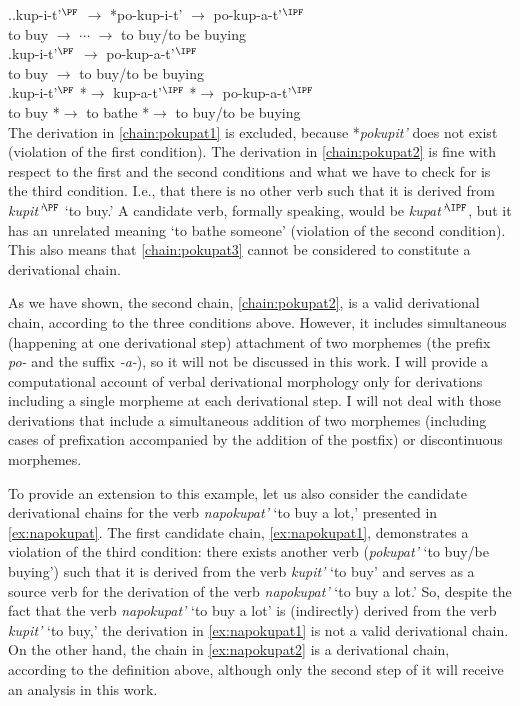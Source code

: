 \ex.\label{chain:pokupat}\ag.\label{chain:pokupat1}kup-i-t'$^\PF$ $\rightarrow$ *po-kup-i-t' $\rightarrow$ po-kup-a-t'$^\IPF$\\	
{to buy} $\rightarrow$ $\cdots$ $\rightarrow$ {to buy/to be buying}\\
\bg.\label{chain:pokupat2}kup-i-t'$^\PF$ $\rightarrow$ po-kup-a-t'$^\IPF$\\
{to buy} $\rightarrow$ {to buy/to be buying}\\
\bg.\label{chain:pokupat3}kup-i-t'$^\PF$ *$\rightarrow$ kup-a-t'$^\IPF$ *$\rightarrow$ po-kup-a-t'$^\IPF$\\
{to buy} *$\rightarrow$ {to bathe} *$\rightarrow$ {to buy/to be buying}\\

The derivation in \ref{chain:pokupat1} is excluded, because *\textit{pokupit'} does not exist (violation of the first condition). The derivation in \ref{chain:pokupat2} is fine with respect to the first and the second conditions and what we have to check for is the third condition. I.e., that there is no other verb such that it is derived from \textit{kupit'}$^\PF$ `to buy.'  A candidate verb, formally speaking, would be \textit{kupat'$^\IPF$}, but it has an unrelated meaning `to bathe someone' (violation of the second condition). This also means that \ref{chain:pokupat3} cannot be considered to constitute a derivational chain.  

As we have shown, the second chain, \ref{chain:pokupat2}, is a valid derivational chain, according to the three conditions above. However, it includes simultaneous (happening at one derivational step) attachment of two morphemes (the prefix \textit{po-} and the suffix \textit{-a-}), so it will not be discussed in this work. I will provide a computational account of verbal derivational morphology only for derivations including a single morpheme at each derivational step. I will not deal with those derivations that include a simultaneous addition of two morphemes (including cases of prefixation accompanied by the addition of the postfix) or discontinuous morphemes.

To provide an extension to this example, let us also consider the candidate derivational chains for the verb \textit{napokupat'} `to buy a lot,' presented in \ref{ex:napokupat}. The first candidate chain, \ref{ex:napokupat1}, demonstrates a violation of the third condition: there exists another verb (\textit{pokupat'} `to buy/be buying') such that it is derived from the verb \textit{kupit'} `to buy' and serves as a source verb for the derivation of the verb \textit{napokupat'} `to buy a lot.' So, despite the fact that the verb \textit{napokupat'} `to buy a lot' is (indirectly) derived from the verb \textit{kupit'} `to buy,' the derivation in \ref{ex:napokupat1} is not a valid derivational chain. On the other hand, the chain in \ref{ex:napokupat2} is a derivational chain, according to the definition above, although only the second step of it will receive an analysis in this work. 

